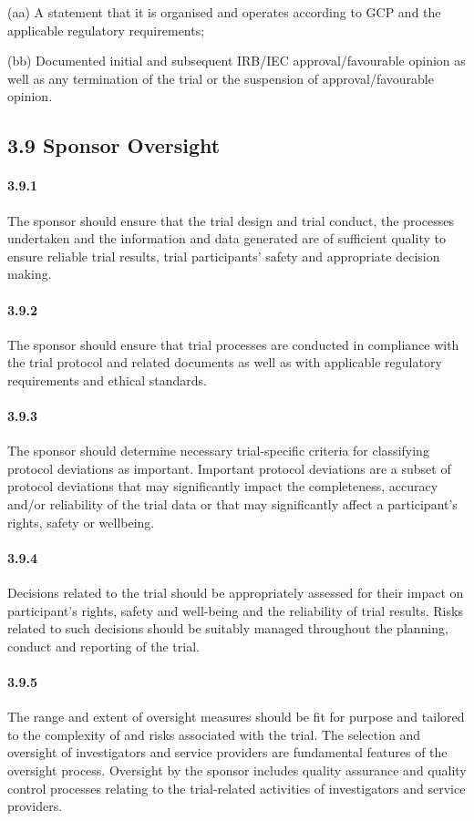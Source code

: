 \documentclass[11pt]{article}
\begin{document}
(aa) A statement that it is organised and operates according to GCP and the applicable regulatory requirements;


(bb) Documented initial and subsequent IRB/IEC approval/favourable opinion as well as any termination of the trial or the suspension of approval/favourable opinion.


\subsection{3.9 Sponsor Oversight}

\paragraph{3.9.1} The sponsor should ensure that the trial design and trial conduct, the processes undertaken and the information and data generated are of sufficient quality to ensure reliable trial results, trial participants' safety and appropriate decision making.

\paragraph{3.9.2} The sponsor should ensure that trial processes are conducted in compliance with the trial protocol and related documents as well as with applicable regulatory requirements and ethical standards.

\paragraph{3.9.3} The sponsor should determine necessary trial-specific criteria for classifying protocol deviations as important. Important protocol deviations are a subset of protocol deviations that may significantly impact the completeness, accuracy and/or reliability of the trial data or that may significantly affect a participant's rights, safety or wellbeing.

\paragraph{3.9.4} Decisions related to the trial should be appropriately assessed for their impact on participant's rights, safety and well-being and the reliability of trial results. Risks related to such decisions should be suitably managed throughout the planning, conduct and reporting of the trial.

\paragraph{3.9.5} The range and extent of oversight measures should be fit for purpose and tailored to the complexity of and risks associated with the trial. The selection and oversight of investigators and service providers are fundamental features of the oversight process. Oversight by the sponsor includes quality assurance and quality control processes relating to the trial-related activities of investigators and service providers.
\end{document}
